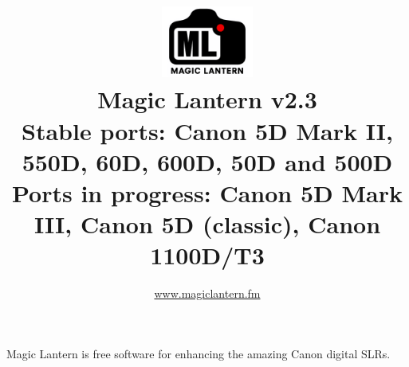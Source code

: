 \documentclass[a4paper,english]{article}
\renewcommand{\href}[2]{\directlua{ShowLink("#1", "#2")}}
\begin{document}
\title{\vspace{-1cm}\includegraphics[width=3cm]{logo-trans.png}\\Magic Lantern v2.3\\{\small \vskip1mm Stable ports: Canon 5D Mark II, 550D, 60D, 600D, 50D and 500D \\\vskip-3mm \scriptsize Ports in progress: Canon 5D Mark III, Canon 5D (classic), Canon 1100D/T3 }}
\author{\url{www.magiclantern.fm}}
\maketitle



Magic Lantern is free software for enhancing the amazing Canon digital SLRs.
\vspace{3mm}
\end{document}
